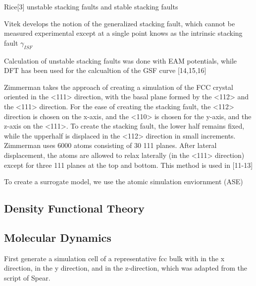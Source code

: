 Rice[3] unstable stacking faults and stable stacking faults

Vitek\cite{vitek1966_gsf,vitek1968_gsf} develops the notion of the generalized stacking fault, which cannot be measured experimental except at a single point knows as the intrinsic stacking fault $\gamma_{ISF}$

Calculation of unstable stacking faults\cite{sun1990_eam_esf,sun1993_eam_esf,farkas1997_eam_usf} was done with EAM potentials, while DFT has been used for the calcualtion of the GSF curve [14,15,16]

Zimmerman takes the approach of creating a simulation of the FCC crystal oriented in the <111> direction, with the basal plane formed by the <112> and the <111> direction.  For the ease of creating the stacking fault, the <112> direction is chosen on the x-axis, and the <110> is chosen for the y-axis, and the z-axis on the <111>.  To create the stacking fault, the lower half remains fixed, while the upperhalf is displaced in the <112> direction in small increments.  Zimmerman uses 6000 atoms consisting of 30 {111} planes.  After lateral displacement, the atoms are allowed to relax laterally (in the <111> direction) except for three {111} planes at the top and bottom.  This method is used in [11-13]

To create a surrogate model, we use the atomic simulation enviornment (ASE)

\subsection{Density Functional Theory}



\subsection{Molecular Dynamics}

First generate a simulation cell of a representative fcc bulk with \hkl[1 1 2] in the x direction, \hkl[-1 1 0] in the y direction, and \hkl[-1 -1 1] in the z-direction, which was adapted from the script of Spear\cite{spear2012_lammps_gsf}.
